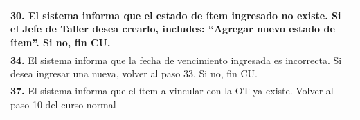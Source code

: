 \documentclass[12pt]{extarticle}
\begin{document}
\begin{spacing}{1.2}
\begin{longtable}{ |p{8cm}|p{8cm}| }
            \multicolumn{2}{|p{16cm}|}{\textbf{30. }El sistema informa que el estado de ítem ingresado no existe. Si el Jefe de Taller desea crearlo, includes: ``Agregar nuevo estado de ítem''. Si no, fin CU.}\\
            \hline
            \multicolumn{2}{|p{16cm}|}{\textbf{34. }El sistema informa que la fecha de vencimiento ingresada es incorrecta. Si desea ingresar una nueva, volver al paso 33. Si no, fin CU.}\\
            \hline  
            \multicolumn{2}{|p{16cm}|}{\textbf{37. }El sistema informa que el ítem a vincular con la OT ya existe. Volver al paso 10 del curso normal}\\
        \hline  
    \end{longtable}



    \setcounter{step}{0}



\end{spacing}
\end{document}
